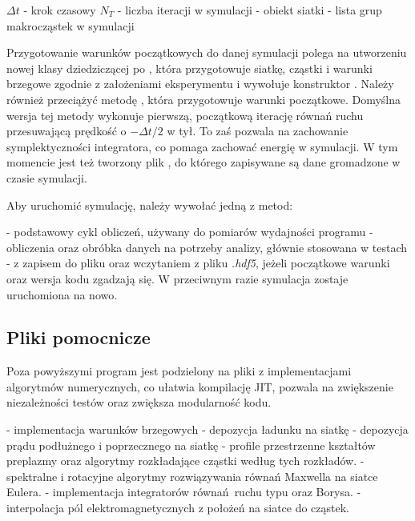 \begin{itemize}
    \itemi $\Delta t$ - krok czasowy
    \itemi $N_T$ - liczba iteracji w symulacji
    \itemi {} - obiekt siatki
    \itemi {} - lista grup makrocząstek w symulacji
\end{itemize}

Przygotowanie warunków początkowych do danej symulacji polega na utworzeniu
nowej klasy dziedziczącej po , która przygotowuje siatkę,
cząstki i warunki brzegowe zgodnie z założeniami eksperymentu i wywołuje
konstruktor .  Należy również przeciążyć metodę
, która przygotowuje warunki początkowe.
Domyślna wersja tej metody wykonuje pierwszą, początkową iterację równań ruchu
przesuwającą prędkość o $-\Delta t / 2$ w tył. To zaś pozwala na zachowanie
symplektyczności integratora, co pomaga zachować energię w symulacji.  W tym
momencie jest też tworzony plik , do którego zapisywane są dane
gromadzone w czasie symulacji.

Aby uruchomić symulację, należy wywołać jedną z metod:
\begin{itemize}
     \itemi {} - podstawowy cykl obliczeń, używany do pomiarów
         wydajności programu
     \itemi {} - obliczenia oraz obróbka danych na potrzeby
         analizy, głównie stosowana w testach
     \itemi {} -  z zapisem do pliku oraz
         wczytaniem z pliku \emph{.hdf5}, jeżeli początkowe warunki oraz
         wersja kodu zgadzają się. W przeciwnym razie symulacja zostaje
         uruchomiona na nowo.
\end{itemize}

\subsection{Pliki pomocnicze}
Poza powyższymi program jest podzielony na pliki z implementacjami algorytmów numerycznych,
co ułatwia kompilację JIT, pozwala na zwiększenie niezależności testów oraz
zwiększa modularność kodu.
\begin{itemize}
    \itemi {} - implementacja warunków brzegowych
    \itemi {} - depozycja ładunku na siatkę
    \itemi {} - depozycja prądu podłużnego i poprzecznego na siatkę
    \itemi {} - profile przestrzenne kształtów preplazmy
        oraz algorytmy rozkładające cząstki według tych rozkładów.
    \itemi {} - spektralne i rotacyjne algorytmy rozwiązywania równań Maxwella na siatce Eulera.
    \itemi {} - implementacja integratorów równań ruchu typu  oraz Borysa.
    \itemi {} - interpolacja pól elektromagnetycznych z położeń na siatce do cząstek.
\end{itemize}

